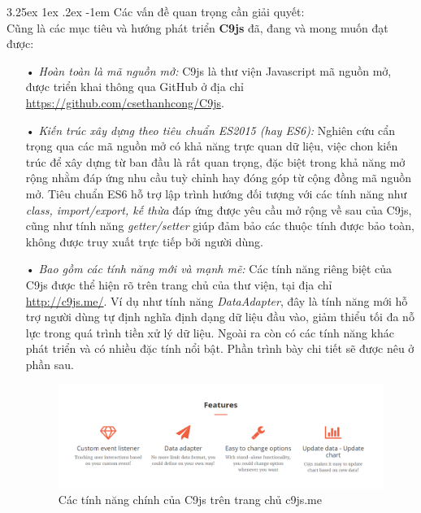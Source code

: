 \documentclass[12pt,a4paper]{article}
\makeatletter
\newcommand{\myparagraph}[1]{\paragraph{#1}\mbox{}\\} %
\renewcommand\paragraph{\@startsection{paragraph}{5}{\z@}%
  {3.25ex \@plus1ex \@minus.2ex}%
  {-1em}%
  {\normalfont\normalsize\bfseries}}
\makeatother
\begin{document}
\myparagraph{Các vấn đề quan trọng cần giải quyết:}
Cũng là các mục tiêu và hướng phát triển \textbf{C9js} đã, đang và mong muốn đạt được: 
\begin{itemize}
\item[•] \emph{Hoàn toàn là mã nguồn mở:} C9js là thư viện Javascript mã nguồn mở, được triển khai thông qua GitHub ở địa chỉ \url{https://github.com/csethanhcong/C9js}.

\item[•] \emph{Kiến trúc xây dựng theo tiêu chuẩn ES2015 (hay ES6):} Nghiên cứu cẩn trọng qua các mã nguồn mở có khả năng trực quan dữ liệu, việc chon kiến trúc để xây dựng từ ban đầu là rất quan trọng, đặc biệt trong khả năng mở rộng nhằm đáp ứng nhu cầu tuỳ chỉnh hay đóng góp từ cộng đồng mã nguồn mở. Tiêu chuẩn ES6 hỗ trợ lập trình hướng đối tượng với các tính năng như \textit{class, import/export, kế thừa} đáp ứng được yêu cầu mở rộng về sau của C9js, cũng như tính năng \textit{getter/setter} giúp đảm bảo các thuộc tính được bảo toàn, không được truy xuất trực tiếp bởi người dùng.

\item[•] \emph{Bao gồm các tính năng mới và mạnh mẽ:}
Các tính năng riêng biệt của C9js được thể hiện rõ trên trang chủ của thư viện, tại địa chỉ \url{http://c9js.me/}. Ví dụ như tính năng \textit{DataAdapter}, đây là tính năng mới hỗ trợ người dùng tự định nghĩa định dạng dữ liệu đầu vào, giảm thiểu tối đa nỗ lực trong quá trình tiền xử lý dữ liệu. Ngoài ra còn có các tính năng khác phát triển và có nhiều đặc tính nổi bật. Phần trình bày chi tiết sẽ được nêu ở phần sau.

\begin{figure}[!h]
	\begin{center}
    \includegraphics[scale=.5]{image/c9js_feature}
    \caption{Các tính năng chính của C9js trên trang chủ c9js.me}
    \label{fig:c9js_feature}
	\end{center}
\end{figure}

\end{itemize}
\end{document}
